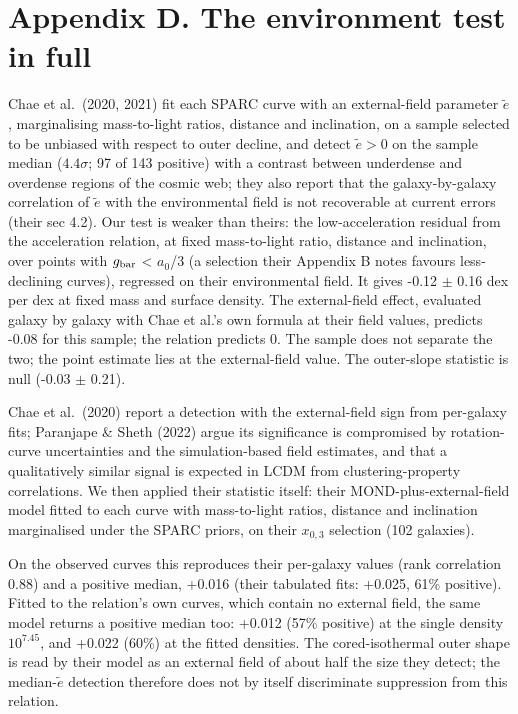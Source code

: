 \documentclass[
  10pt,
]{article}
\begin{document}
\section{Appendix D. The environment test in full}\label{appendix-d.-the-environment-test-in-full}

Chae et al.~(2020, 2021) fit each SPARC curve with an external-field parameter $\tilde e$, marginalising mass-to-light ratios, distance and inclination, on a sample selected to be unbiased with respect to outer decline, and detect $\tilde e>0$ on the sample median ($4.4\sigma$; 97 of 143 positive) with a contrast between underdense and overdense regions of the cosmic web; they also report that the galaxy-by-galaxy correlation of $\tilde e$ with the environmental field is not recoverable at current errors (their sec 4.2). Our test is weaker than theirs: the low-acceleration residual from the acceleration relation, at fixed mass-to-light ratio, distance and inclination, over points with $g_{\rm bar}$ \textless{} $a_0$/3 (a selection their Appendix B notes favours less-declining curves), regressed on their environmental field. It gives -0.12 $\pm$ 0.16 dex per dex at fixed mass and surface density. The external-field effect, evaluated galaxy by galaxy with Chae et al.'s own formula at their field values, predicts -0.08 for this sample; the relation predicts 0. The sample does not separate the two; the point estimate lies at the external-field value. The outer-slope statistic is null (-0.03 $\pm$ 0.21).

Chae et al.~(2020) report a detection with the external-field sign from per-galaxy fits; Paranjape \& Sheth (2022) argue its significance is compromised by rotation-curve uncertainties and the simulation-based field estimates, and that a qualitatively similar signal is expected in LCDM from clustering-property correlations. We then applied their statistic itself: their MOND-plus-external-field model fitted to each curve with mass-to-light ratios, distance and inclination marginalised under the SPARC priors, on their $x_{0,3}$ selection (102 galaxies).

On the observed curves this reproduces their per-galaxy values (rank correlation 0.88) and a positive median, +0.016 (their tabulated fits: +0.025, 61\% positive). Fitted to the relation's own curves, which contain no external field, the same model returns a positive median too: +0.012 (57\% positive) at the single density $10^{7.45}$, and +0.022 (60\%) at the fitted densities. The cored-isothermal outer shape is read by their model as an external field of about half the size they detect; the median-$\tilde e$ detection therefore does not by itself discriminate suppression from this relation.
\end{document}

